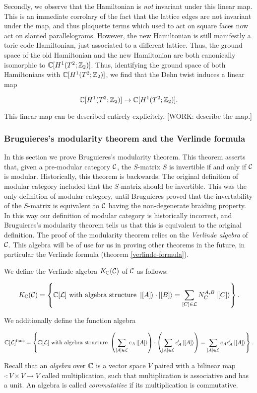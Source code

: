 Secondly, we observe that the Hamiltonian is \textit{not} invariant under this linear map. This is an immediate corrolary of the fact that the lattice edges are not invariant under the map, and thus plaquette terms which used to act on square faces now act on slanted parallelograms. However, the new Hamiltonian is still manifestly a toric code Hamiltonian, just associated to a different lattice. Thus, the ground space of the old Hamiltonian and the new Hamiltonian are both canonically isomorphic to ${\mathbb C}[H^1(T^2;{\mathbb Z}_2)]$. Thus, identifying the ground space of both Hamiltonians with ${\mathbb C}[H^1(T^2;{\mathbb Z}_2)]$, we find that the Dehn twist induces a linear map

$${\mathbb C}[H^1(T^2;{\mathbb Z}_2)]\to {\mathbb C}[H^1(T^2;{\mathbb Z}_2)].$$

This linear map can be described entirely explicitely. [WORK: describe the map.]

\subsubsection{Bruguieres's modularity theorem and the Verlinde formula}

In this section we prove Bruguieres's modularity theorem. This theorem asserts that, given a pre-modular category ${\mathcal C}$, the $S$-matrix $S$ is invertible if and only if ${\mathcal C}$ is modular. Historically, this theorem is backwards. The original definition of modular category included that the $S$-matrix should be invertible. This was the only definition of modular category, until Bruguieres proved \cite{bruguieres2000categories} that the invertability of the $S$-matrix is equivalent to ${\mathcal C}$ having the non-degenerate braiding property. In this way our definition of modular category is historically incorrect, and Bruguieres's modularity theorem tells us that this is equivalent to the original definition. The proof of the modularity theorem relies on the {\em Verlinde algebra} of ${\mathcal C}$. This algebra will be of use for us in proving other theorems in the future, in particular the Verlinde formula (theorem \ref{verlinde-formula}).

\begin{defn}

We define the Verlinde algebra $K_{{\mathbb C}}({\mathcal C})$ of ${\mathcal C}$ as follows:

$$K_{{\mathbb C}}({\mathcal C})=
\left\{
{\mathbb C}[{\mathcal L}] \text{ with algebra structure }
\ket{[A]}\cdot \ket{[B]}=\sum_{[C]\in {\mathcal L}}N^{A,B}_{C}\ket{[C]}
\right\}.$$

We additionally define the function algebra

$$
{\mathbb C}[{\mathcal L}]^{\text{func}}=
\left\{
{\mathbb C}[{\mathcal L}] \text{ with algebra structure }
\left(\sum_{[A]\in {\mathcal L}}c_A \ket{[A]}\right)\cdot \left(\sum_{[A]\in {\mathcal L}}c_A' \ket{[A]}\right)= \sum_{[A]\in {\mathcal L}}c_A c_A' \ket{[A]}
\right\}.
$$

Recall that an {\em algebra} over ${\mathbb C}$ is a vector space $V$ paired with a bilinear map $\cdot: V\times V\to V$ called multiplication, such that multiplication is associative and has a unit. An algebra is called {\em commutative} if its multiplication is commutative.
\end{defn}

